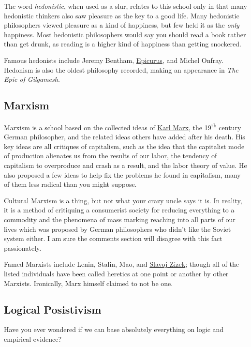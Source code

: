 \documentclass[../my_knowledge.tex]{subfiles}
\begin{document}
The word \textit{hedonistic}, when used as a slur, relates to this school only in that many hedonistic thinkers also saw pleasure as the key to a good life. Many hedonistic philosophers viewed pleasure as a kind of happiness, but few held it as the \textit{only} happiness. Most hedonistic philosophers would say you should read a book rather than get drunk, as reading is a higher kind of happiness than getting snockered.

Famous hedonists include Jeremy Bentham, \href{https://www.youtube.com/watch?v=Kg_47J6sy3A}{Epicurus}, and Michel Onfray. Hedonism is also the oldest philosophy recorded, making an appearance in \textit{The Epic of Gilgamesh}.

\subsection{Marxism}
Marxism is a school based on the collected ideas of \href{https://www.youtube.com/watch?v=fSQgCy_iIcc}{Karl Marx}, the 19\textsuperscript{th} century German philosopher, and the related ideas others have added after his death. His key ideas are all critiques of capitalism, such as the idea that the capitalist mode of production alienates us from the results of our labor, the tendency of capitalism to overproduce and crash as a result, and the labor theory of value. He also proposed a few ideas to help fix the problems he found in capitalism, many of them less radical than you might suppose.

Cultural Marxism is a thing, but not what \href{https://en.wikipedia.org/wiki/Frankfurt_School#Cultural_Marxism_conspiracy_theory}{your crazy uncle says it is}. In reality, it is a method of critiquing a consumerist society for reducing everything to a commodity and the phenomena of mass marking reaching into all parts of our lives which was proposed by German philosophers who didn’t like the Soviet system either. I am sure the comments section will disagree with this fact passionately.

Famed Marxists include Lenin, Stalin, Mao, and \href{https://bigthink.com/experts/slavoj-zizek}{Slavoj Zizek}; though all of the listed individuals have been called heretics at one point or another by other Marxists. Ironically, Marx himself claimed to not be one.

\subsection{Logical Posistivism}
Have you ever wondered if we can base absolutely everything on logic and empirical evidence?
\end{document}
